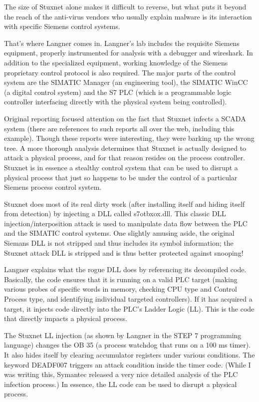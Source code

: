 \documentclass[10pt,twoside,openleft]{memoir}
\begin{document}
The size of Stuxnet alone makes it difficult to reverse, but what puts it beyond the reach of the anti-virus vendors who usually explain malware is its interaction with specific Siemens control systems.

That's where Langner comes in. Langner's lab includes the requisite Siemens equipment, properly instrumented for analysis with a debugger and wireshark. In addition to the specialized equipment, working knowledge of the Siemens proprietary control protocol is also required. The major parts of the control system are the SIMATIC Manager (an engineering tool), the SIMATIC WinCC (a digital control system) and the S7 PLC (which is a programmable logic controller interfacing directly with the physical system being controlled).

Original reporting focused attention on the fact that Stuxnet infects a SCADA system (there are references to such reports all over the web, including this example). Though these reports were interesting, they were barking up the wrong tree. A more thorough analysis determines that Stuxnet is actually designed to attack a physical process, and for that reason resides on the process controller. Stuxnet is in essence a stealthy control system that can be used to disrupt a physical process that just so happens to be under the control of a particular Siemens process control system.

Stuxnet does most of its real dirty work (after installing itself and hiding itself from detection) by injecting a DLL called s7otbxox.dll. This classic DLL injection/interposition attack is used to manipulate data flow between the PLC and the SIMATIC control systems. One slightly amusing aside, the original Siemans DLL is not stripped and thus includes its symbol information; the Stuxnet attack DLL is stripped and is thus better protected against snooping!

Langner explains what the rogue DLL does by referencing its decompiled code. Basically, the code ensures that it is running on a valid PLC target (making various probes of specific words in memory, checking CPU type and Control Process type, and identifying individual targeted controllers). If it has acquired a target, it injects code directly into the PLC's Ladder Logic (LL). This is the code that directly impacts a physical process.

The Stuxnet LL injection (as shown by Langner in the STEP 7 programming language) changes the OB 35 (a process watchdog that runs on a 100 ms timer). It also hides itself by clearing accumulator registers under various conditions. The keyword DEADF007 triggers an attack condition inside the timer code. (While I was writing this, Symantec released a very nice detailed analysis of the PLC infection process.) In essence, the LL code can be used to disrupt a physical process.
\end{document}
